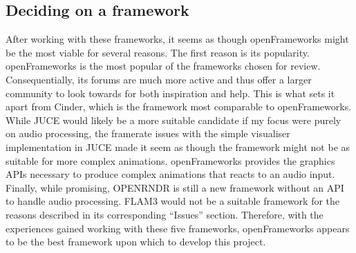 \documentclass[../main_report1.tex]{subfiles}
\begin{document}
\subsection{Deciding on a framework}
After working with these frameworks, it seems as though openFrameworks might be the most viable for several reasons. The first reason is its popularity. openFrameworks is the most popular of the frameworks chosen for review. Consequentially, its forums are much more active and thus offer a larger community to look towards for both inspiration and help. This is what sets it apart from Cinder, which is the framework most comparable to openFrameworks. While JUCE would likely be a more suitable candidate if my focus were purely on audio processing, the framerate issues with the simple visualiser implementation in JUCE made it seem as though the framework might not be as suitable for more complex animations. openFrameworks provides the graphics APIs necessary to produce complex animations that reacts to an audio input. Finally, while promising, OPENRNDR is still a new framework without an API to handle audio processing. FLAM3 would not be a suitable framework for the reasons described in its corresponding ``Issues'' section. Therefore, with the experiences gained working with these five frameworks, openFrameworks appears to be the best framework upon which to develop this project.
\end{document}
